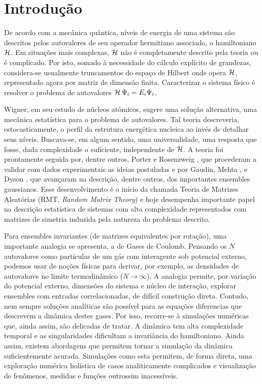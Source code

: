 \chapter{Introdução}
\label{Capitulo: Intro}

De acordo com a mecânica quântica, níveis de energia de uma sistema são descritos pelos autovalores de seu operador hermitiano associado, o hamiltoniano $\operatorname{\mathcal{H}}$. Em situações mais complexas, $\operatorname{\mathcal{H}}$ não é completamente descrito pela teoria ou é complicado. Por isto, somado à necessidade do cálculo explícito de grandezas, considera-se usualmente truncamentos do espaço de Hilbert onde opera $\operatorname{\mathcal{H}}$, representado agora por matriz de dimensão finita. Caracterizar o sistema físico é resolver o problema de autovalores $\operatorname{\mathcal{H}} \Psi_i = E_i \Psi_i$.

Wigner, em seu estudo de núcleos atômicos, sugere uma solução alternativa, uma mecânica estatística para o problema de autovalores. Tal teoria descreveria, estocasticamente, o perfil da estrutura energética nucleica ao invés de detalhar seus níveis. Buscava-se, em algum sentido, uma universalidade, uma resposta que fosse, dada complexidade o suficiente, independente de $\operatorname{\mathcal{H}}$. A teoria foi prontamente seguida por, dentre outros, Porter e Rosenzweig \cite{PoterRosen}, que procederam a validar com dados experimentais as ideias postuladas e por Gaudin, Mehta \cite{MehtaGaudin}, e Dyson \cite{Dyson}, que avançaram na descrição, dentre outros, dos importantes ensembles gaussianos. Esse desenvolvimento é o início da chamada Teoria de Matrizes Aleatórias (RMT, \textit{Random Matrix Theory}) e hoje desempenha importante papel na descrição estatística de sistemas com alta complexidade representados com matrizes de simetria induzida pela natureza do problema descrito.

Para ensembles invariantes (de matrizes equivalentes por rotação), uma importante analogia se apresenta, a de Gases de Coulomb. Pensando os $N$ autovalores como partículas de um gás com interagente sob potencial externo, podemos usar de noções físicas para derivar, por exemplo, as densidades de autovalores no limite termodinâmico ($N \rightarrow \infty$). A analogia permite, por variação do potencial externo, dimensões do sistema e núcleo de interação, explorar ensembles com entradas correlacionadas, de difícil construção direta. Contudo, nem sempre soluções analíticas são possível para as equações diferencias que descrevem a dinâmica destes gases. Por isso, recorre-se à simulações numéricas que, ainda assim, são delicadas de tratar. A dinâmica tem alta complexidade temporal e as singularidades dificultam a invariância do hamiltoniano. Ainda assim, existem abordagens que permitem tornar a simulação da dinâmica suficientemente acurada. Simulações como esta permitem, de forma direta, uma exploração numérica holística de casos analiticamente complicados e visualização de fenômenos, medidas e funções outrossim inacessíveis.


